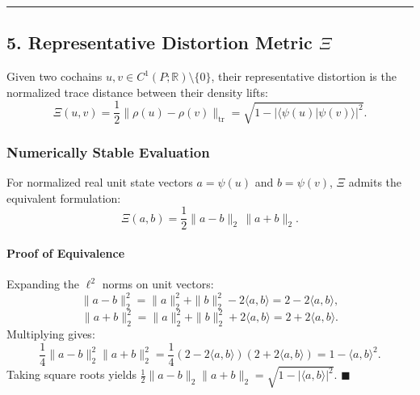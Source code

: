 \documentclass[
  10pt,
]{article}
\begin{document}
\begin{center}\rule{0.5\linewidth}{0.5pt}\end{center}

\subsection[5. Representative Distortion Metric ]{\texorpdfstring{5. Representative Distortion Metric \protect\hypertarget{math-E0002-0163}{}{\(\Xi\)}}{5. Representative Distortion Metric \textbackslash Xi}}\label{representative-distortion-metric-xi}

Given two cochains \protect\hypertarget{math-E0133-0164}{}{\(u, v \in C^1(P; \mathbb{R}) \setminus \{0\}\)}, their representative distortion is the normalized trace distance between their density lifts: \protect\hypertarget{math-E0134-0165}{}{\[\Xi(u, v) = \frac{1}{2} \|\rho(u) - \rho(v)\|_{\mathrm{tr}} = \sqrt{1 - |\langle \psi(u) | \psi(v) \rangle|^2}.\]}

\subsubsection{Numerically Stable Evaluation}\label{numerically-stable-evaluation}

For normalized real unit state vectors \protect\hypertarget{math-E0135-0166}{}{\(a = \psi(u)\)} and \protect\hypertarget{math-E0136-0167}{}{\(b = \psi(v)\)}, \protect\hypertarget{math-E0002-0168}{}{\(\Xi\)} admits the equivalent formulation: \protect\hypertarget{math-E0137-0169}{}{\[\boxed{\Xi(a, b) = \frac{1}{2} \|a - b\|_2 \, \|a + b\|_2.}\]}

\paragraph{Proof of Equivalence}\label{proof-of-equivalence}

Expanding the \protect\hypertarget{math-E0058-0170}{}{\(\ell^2\)} norms on unit vectors: \protect\hypertarget{math-E0138-0171}{}{\[\|a - b\|_2^2 = \|a\|_2^2 + \|b\|_2^2 - 2\langle a, b \rangle = 2 - 2\langle a, b \rangle,\]} \protect\hypertarget{math-E0139-0172}{}{\[\|a + b\|_2^2 = \|a\|_2^2 + \|b\|_2^2 + 2\langle a, b \rangle = 2 + 2\langle a, b \rangle.\]} Multiplying gives: \protect\hypertarget{math-E0140-0173}{}{\[\frac{1}{4} \|a - b\|_2^2 \|a + b\|_2^2 = \frac{1}{4}(2 - 2\langle a, b \rangle)(2 + 2\langle a, b \rangle) = 1 - \langle a, b \rangle^2.\]} Taking square roots yields \protect\hypertarget{math-E0141-0174}{}{\(\frac{1}{2} \|a - b\|_2 \|a + b\|_2 = \sqrt{1 - |\langle a, b \rangle|^2}\)}. \protect\hypertarget{math-E0030-0175}{}{\(\blacksquare\)}
\end{document}
